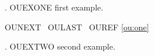 \documentclass[11pt]{article}
\begin{document}
\ex.\label{ou:one} OUEXONE first example.

OUNEXT \Next\ OULAST \Last\ OUREF \ref{ou:one}

\ex. OUEXTWO second example.
\end{document}
